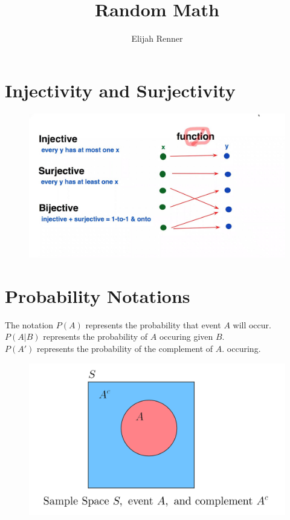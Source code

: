 \documentclass[12pt]{article}
\title{Random Math}
\author{Elijah Renner}
\begin{document}
\maketitle

\vspace{0.5in}

\tableofcontents

\section{Injectivity and Surjectivity}

\begin{figure}[H]
	\centering
	\includegraphics[scale=0.3]{media/maxresdefault.jpg}
\end{figure}

\section{Probability Notations}

The notation \(P(A)\) represents the probability that event \(A\) will occur.\\

\(P(A|B)\) represents the probability of \(A\) occuring given \(B\).\\

\(P(A')\) represents the probability of the complement of \(A\).
occuring.\\

\begin{figure}[H]
	\centering
	\includegraphics[scale=0.3]{media/compliment.png}
\end{figure}
\end{document}
